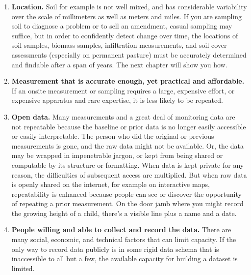 \documentclass[11pt,letterpaper,twoside,onecolumn]{memoir}
\begin{document}
\begin{enumerate}
\item \textbf{Location.} Soil for example is not well mixed, and has considerable variability over the scale of millimeters as well as meters and miles. If you are sampling soil to diagnose a problem or to sell an amendment, casual sampling may suffice, but in order to confidently detect change over time, the locations of soil samples, biomass samples, infiltration measurements, and soil cover assessments (especially on permanent pasture) must be accurately determined and findable after a span of years. The next chapter will show you how.

\item \textbf{Measurement that is accurate enough, yet practical and affordable.} If an onsite measurement or sampling requires a large, expensive effort, or expensive apparatus and rare expertise, it is less likely to be repeated. 

\item \textbf{Open data.} Many measurements and a great deal of monitoring data are not repeatable because the baseline or prior data is no longer easily accessible or easily interpretable. The person who did the original or previous measurements is gone, and the raw data might not be available. Or, the data may be wrapped in impenetrable jargon, or kept from being shared or computable by its structure or formatting. When data is kept private for any reason, the difficulties of subsequent access are multiplied. But when raw data is openly shared on the internet, for example on interactive maps, repeatability is enhanced because people can see or discover the opportunity of repeating a prior measurement. On the door jamb where you might record the growing height of a child, there's a visible line plus a name and a date.

\item \textbf{People willing and able to collect and record the data.} There are many social, economic, and technical factors that can limit capacity. If the only way to record data publicly is in some rigid data schema that is inaccessible to all but a few, the available capacity for building a dataset is limited.

\end{enumerate}
\end{document}
